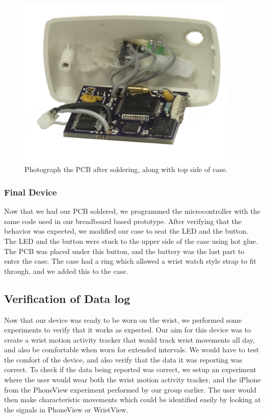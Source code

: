 \begin{figure}
\begin{center}
\includegraphics[width=0.95\textwidth]{images/PCBBare.jpg}
\caption{Photograph the PCB after soldering, along with top side of case.}
\label{Fig:PCBwithCase}
\end{center}
\end{figure}


\subsubsection{Final Device}
\label{Sec:FinalDevice}
Now that we had our PCB soldered,
we programmed the microcontroller with the same code used in our breadboard based prototype.
After verifying that the behavior was expected,
we modified our case to seat the LED and the button.
The LED and the button were stuck to the upper side of the case using hot glue.
The PCB was placed under this button, and the battery was the last part to enter the case.
The case had a ring which allowed a wrist watch style strap to fit through,
and we added this to the case.

\subsection{Verification of Data log}
\label{Sec:Motion Data}
Now that our device was ready to be worn on the wrist,
we performed some experiments to verify that it works as expected.
Our aim for this device was to create a wrist motion activity tracker that would track wrist movements all day,
and also be comfortable when worn for extended intervals.
We would have to test the comfort of the device,
and also verify that the data it was reporting was correct.
To check if the data being reported was correct,
we setup an experiment where the user would wear both the wrist motion activity tracker,
and the iPhone from the PhoneView experiment performed by our group earlier.
The user would then make characteristic movements which could be identified easily by looking at the signals in PhoneView or WristView.


